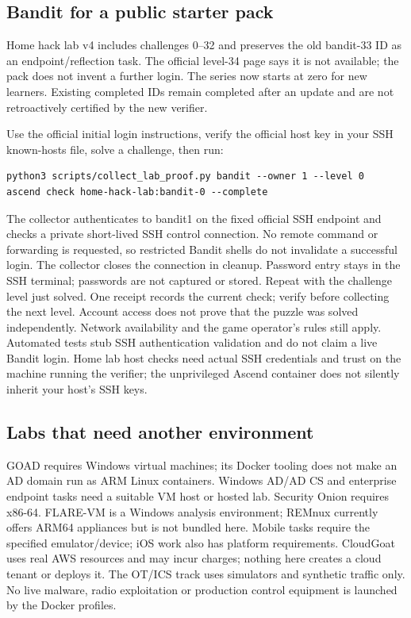 \subsection{Bandit for a public starter pack}
Home hack lab v4 includes challenges 0--32 and preserves the old bandit-33 ID as an
endpoint/reflection task. The official level-34 page says it is not available; the
pack does not invent a further login. The series now starts at zero for new learners.
Existing completed IDs remain completed after an update and are not retroactively
certified by the new verifier.

Use the official initial login instructions, verify the official host key in your
SSH known-hosts file, solve a challenge, then run:
\begin{verbatim}
python3 scripts/collect_lab_proof.py bandit --owner 1 --level 0
ascend check home-hack-lab:bandit-0 --complete
\end{verbatim}
The collector authenticates to bandit1 on the fixed official SSH endpoint and checks a private short-lived SSH control connection. No remote command or forwarding
is requested, so restricted Bandit shells do not invalidate a successful login.
The collector closes the connection in cleanup. Password entry stays in the SSH terminal; passwords are not captured
or stored. Repeat with the challenge level just solved. One receipt records the
current check; verify before collecting the next level. Account access does not prove
that the puzzle was solved independently. Network availability and the game operator's
rules still apply. Automated tests stub SSH authentication validation and do not claim a
live Bandit login. Home lab host checks need actual SSH credentials and trust on the
machine running the verifier; the unprivileged Ascend container does not silently
inherit your host's SSH keys.

\subsection{Labs that need another environment}
GOAD requires Windows virtual machines; its Docker tooling does not make an AD domain
run as ARM Linux containers. Windows AD/AD CS and enterprise endpoint tasks need a
suitable VM host or hosted lab. Security Onion requires x86-64. FLARE-VM is a Windows
analysis environment; REMnux currently offers ARM64 appliances but is not bundled
here. Mobile tasks require the specified emulator/device; iOS work also has platform
requirements. CloudGoat uses real AWS resources and may incur charges; nothing here
creates a cloud tenant or deploys it. The OT/ICS track uses simulators and synthetic
traffic only. No live malware, radio exploitation or production control equipment
is launched by the Docker profiles.

